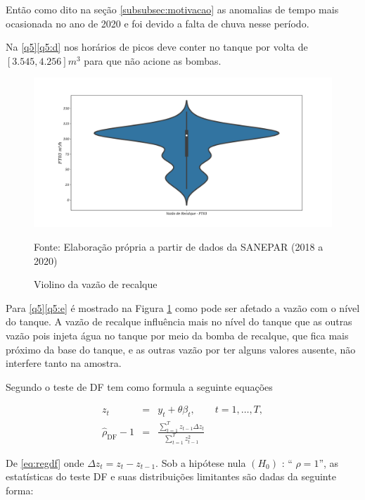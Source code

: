 \begin{itemize}
Então como dito na seção \ref{subsubsec:motivacao} as anomalias de tempo mais ocasionada no ano de 2020 e foi devido a falta de chuva nesse período.

Na \ref{q5}\ref{q5:d} nos horários de picos deve conter no tanque por volta de $[3.545,4.256] m^3$ para que não acione as bombas.



\begin{figure}[H]
	\centering
	\caption{Violino da vazão de recalque}
	\label{fig:ft03}
	\includegraphics[width=1\linewidth]{Resultados/Figuras/ft03}
	
	Fonte: Elaboração própria a partir de dados da SANEPAR (2018 a 2020)
\end{figure}

Para \ref{q5}\ref{q5:e} é mostrado na Figura \ref{fig:ft03} como pode ser afetado a vazão com o nível do tanque. A vazão de recalque influência mais no nível do tanque que as outras vazão pois injeta água no tanque por meio da bomba de recalque, que fica mais próximo da base do tanque, e as outras vazão por ter alguns valores ausente, não interfere tanto na amostra.

\end{itemize}

Segundo   o teste de DF tem como formula a seguinte equações

\begin{eqnarray}
	z_t&=& y_t+\theta \beta_t, \qquad t=1,\ldots, T, \label{eq:df3}\\	
\hat{\rho}_{\mathrm{DF}}-1&=&\frac{\sum_{t=1}^T z_{t-1} \Delta z_t}{\sum_{t=1}^T z_{t-1}^2} \label{eq:regdf}
\end{eqnarray}

De \eqref{eq:regdf} onde $\Delta z_t=z_t-z_{t-1}$. Sob a hipótese nula $\left(H_0\right)$ : `` $\rho=1$'', as estatísticas do teste DF e suas distribuições limitantes são dadas da seguinte forma:


